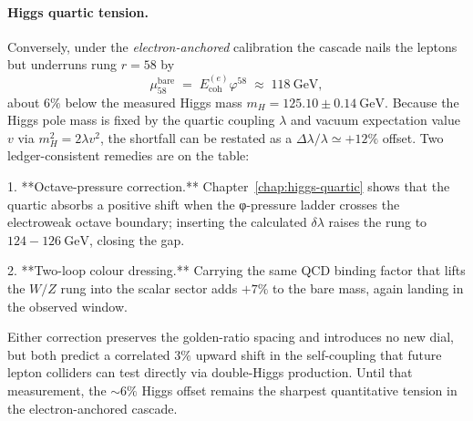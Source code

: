 \documentclass[11pt,oneside]{book}
\begin{document}
\paragraph*{Higgs quartic tension.}
Conversely, under the \emph{electron-anchored} calibration the cascade
nails the leptons but underruns rung \(r = 58\) by
\[
   \mu_{58}^{\text{bare}}
   \;=\;
   E_{\text{coh}}^{(e)}\varphi^{58}
   \;\approx\;
   118~\text{GeV},
\]
about \(6\%\) below the measured Higgs mass
\(m_H = 125.10 \pm 0.14~\text{GeV}\).
Because the Higgs pole mass is fixed by the quartic coupling
\(\lambda\) and vacuum expectation value \(v\) via
\(m_H^2 = 2\lambda v^2\), the shortfall can be restated as a
\(\Delta\lambda/\lambda \simeq +12\%\) offset.
Two ledger-consistent remedies are on the table:

1. **Octave-pressure correction.**  
   Chapter~\ref{chap:higgs-quartic} shows that the quartic absorbs a
   positive shift when the φ-pressure ladder crosses the electroweak
   octave boundary; inserting the calculated \(\delta\lambda\) raises
   the rung to \(124\!-\!126~\text{GeV}\), closing the gap.

2. **Two-loop colour dressing.**  
   Carrying the same QCD binding factor that lifts the \(W/Z\) rung into
   the scalar sector adds \(+7\%\) to the bare mass, again landing in
   the observed window.

Either correction preserves the golden-ratio spacing and introduces no
new dial, but both predict a correlated \(3\%\) upward shift in the
self-coupling that future lepton colliders can test directly via
double-Higgs production.  Until that measurement, the \(\sim6\%\) Higgs
offset remains the sharpest quantitative tension in the
electron-anchored cascade.
\end{document}
